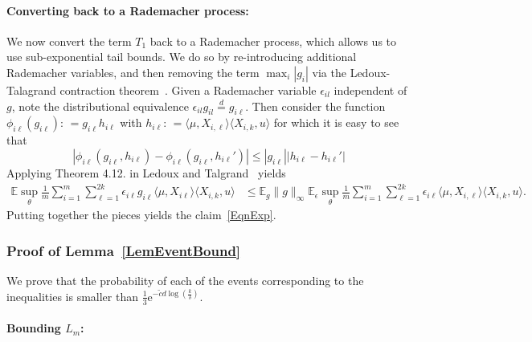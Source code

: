 \documentclass[twoside,11pt]{article}
\def\EE{ \mathbb{E} }
\def\E{ \mathrm{e} }							%
\newcommand{\paramobs}{\mu}
\newcommand{\paramjoint}{\theta}
\newcommand{\defn}{: \, = }
\newcommand{\kdim}{\ensuremath{k}}
\newcommand{\lipproc}{\ensuremath{L_m}}
\begin{document}

\paragraph{Converting back to a Rademacher process:}

We now convert the term $T_1$ back to a Rademacher process, which
allows us to use sub-exponential tail bounds. We do so by
re-introducing additional Rademacher variables, and then removing the
term $\max_i|g_i|$ via the Ledoux-Talagrand contraction
theorem~\cite{LedTalBanach}.  Given a Rademacher variable
$\epsilon_{il}$ independent of $g$, note the distributional
equivalence $\epsilon_{il} g_{il} \overset{d}{=} g_{i\ell}$.  Then
consider the function $\phi_{i\ell} (g_{i\ell}) \defn g_{i\ell}
h_{i\ell}$ with $h_{i\ell} \defn \langle \paramobs,X_{i,\ell}\rangle
\langle X_{i,k},u \rangle $ for which it is easy to see that
\begin{equation}
|\phi_{i\ell}(g_{i\ell},h_{i\ell}) - \phi_{i\ell}(g_{i\ell},
h_{i\ell}')| \leq |g_{i\ell}| |h_{i\ell}-h_{i\ell}'|
\end{equation}
Applying Theorem 4.12. in Ledoux and Talgrand~\cite{LedTalBanach}
yields
\begin{align*}
\EE \sup_{\paramjoint} \frac{1}{m}\sum_{i=1}^m \sum_{\ell=1}^{2k}
\epsilon_{i\ell} g_{i\ell} \langle \paramobs, X_{i\ell}\rangle \langle
X_{i,k},u\rangle &\leq \EE_g \|g\|_{\infty} \EE_\epsilon
\sup_{\paramjoint} \frac{1}{m}\sum_{i=1}^m \sum_{\ell=1}^{2k}
\epsilon_{i\ell} \langle \paramobs, X_{i,\ell}\rangle \langle
X_{i,k},u\rangle.
\end{align*}
Putting together the pieces yields the claim~\eqref{EqnExp}.



\subsubsection{Proof of Lemma~\ref{LemEventBound}}

We prove that the probability of each of the events corresponding to
the inequalities is smaller than $\frac{1}{3}\E^{-\tilde{c}d \log (\frac{\kdim}{\delta})}$.


\paragraph{Bounding $\lipproc$:}
\end{document}
